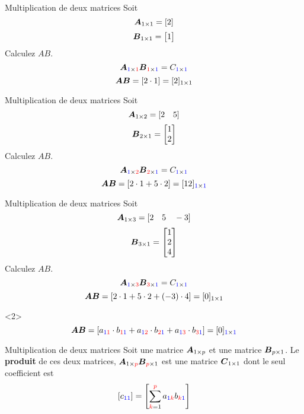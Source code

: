 \documentclass[french, handout]{beamer}
\begin{document}
\begin{frame}{Multiplication de deux matrices}
Soit
\[
\boldsymbol{A}_{1 \times 1} = [2]
\]
\[
\boldsymbol{B}_{1\times 1} = \begin{bmatrix}
1
\end{bmatrix}
\]
Calculez $AB$.
\[
\boldsymbol{A}_{\textcolor{blue}{1} \times \textcolor{red}{1}}\boldsymbol{B}_{\textcolor{red}{1} \times \textcolor{blue}{1}} =  C_{\textcolor{blue}{1} \times \textcolor{blue}{1}}
\]
\[
\boldsymbol{A}\boldsymbol{B} = [2 \cdot 1] = [2]_{1\times 1}
\]
\end{frame}

\begin{frame}{Multiplication de deux matrices}
Soit
\[
\boldsymbol{A}_{1 \times 2} = [2 \quad 5]
\]
\[
\boldsymbol{B}_{2\times 1} = \begin{bmatrix}
1 \\ 2
\end{bmatrix}
\]
Calculez $AB$.
\[
\boldsymbol{A}_{\textcolor{blue}{1} \times \textcolor{red}{2}}\boldsymbol{B}_{\textcolor{red}{2} \times \textcolor{blue}{1}} = C_{\textcolor{blue}{1} \times \textcolor{blue}{1}}
\]
\[
\boldsymbol{A}\boldsymbol{B} = [2 \cdot 1 + 5\cdot 2] = [12]_{\textcolor{blue}{1}\times \textcolor{blue}{1}}
\]
\end{frame}

\begin{frame}{Multiplication de deux matrices}
Soit
\[
\boldsymbol{A}_{1 \times 3} = [2 \quad 5 \quad -3]
\]
\[
\boldsymbol{B}_{3\times 1} = \begin{bmatrix}
1 \\ 2 \\ 4
\end{bmatrix}
\]
Calculez $AB$.
\[
\boldsymbol{A}_{\textcolor{blue}{1} \times \textcolor{red}{3}}\boldsymbol{B}_{\textcolor{red}{3} \times \textcolor{blue}{1}}
= C_{\textcolor{blue}{1} \times \textcolor{blue}{1}}
\]
\[
\boldsymbol{A}\boldsymbol{B} = [2 \cdot 1 + 5\cdot 2 + (-3)\cdot 4] = [0]_{1\times 1}
\]
\begin{block}{}<2>
\[
\boldsymbol{A}\boldsymbol{B} = [a_{\textcolor{blue}{1}\textcolor{red}{1}} \cdot b_{\textcolor{red}{1}\textcolor{blue}{1}} 
  + a_{\textcolor{blue}{1}\textcolor{red}{2}}\cdot b_{\textcolor{red}{2}\textcolor{blue}{1}} 
  + a_{\textcolor{blue}{1}\textcolor{red}{3}}\cdot b_{\textcolor{red}{3}\textcolor{blue}{1}}] 
  = [0]_{\textcolor{blue}{1}\times \textcolor{blue}{1}}
\]
\end{block}
\end{frame}

\begin{frame}{Multiplication de deux matrices}
Soit une matrice $\boldsymbol{A}_{1\times p}$ et une matrice $\boldsymbol{B}_{p\times 1}$.  
Le \textbf{produit} de ces deux matrices, 
$\boldsymbol{A}_{1\times\textcolor{red}{p}}\boldsymbol{B}_{\textcolor{red}{p}\times 1}$ est une matrice $\boldsymbol{C}_{1\times 1}$ dont le seul coefficient est
\huge
\[
[c_{\textcolor{blue}{11}}] = \left[\sum_{\textcolor{red}{k}=1}^{\textcolor{red}{p}} 
a_{\textcolor{blue}{1}\textcolor{red}{k}} 
b_{\textcolor{red}{k}\textcolor{blue}{1}}\right]
\]
\end{frame}
\end{document}
